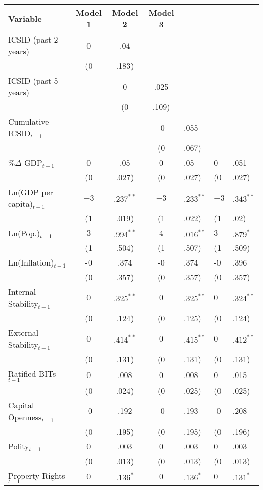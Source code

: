 \begin{table}[ht]
\centering
\begingroup\footnotesize
\begin{tabular}{lccc}
 Variable & Model 1 & Model 2 & Model 3 \\ 
  \hline
\hline
ICSID  (past 2 years) & 0&.04 &  &  \\ 
   & (0&.183) &  &  \\ 
  ICSID  (past 5 years) &  & 0&.025 &  \\ 
   &  & (0&.109) &  \\ 
  Cumulative ICSID$_{t-1}$ &  &  & -0&.055 \\ 
   &  &  & (0&.067) \\ 
  \%$\Delta$ GDP$_{t-1}$ & 0&.05 & 0&.05 & 0&.051 \\ 
   & (0&.027) & (0&.027) & (0&.027) \\ 
  Ln(GDP per capita)$_{t-1}$ & $-3$&$.237^{\ast\ast}$ & $-3$&$.233^{\ast\ast}$ & $-3$&$.343^{\ast\ast}$ \\ 
   & (1&.019) & (1&.022) & (1&.02) \\ 
  Ln(Pop.)$_{t-1}$ & $3$&$.994^{\ast\ast}$ & $4$&$.016^{\ast\ast}$ & $3$&$.879^{\ast}$ \\ 
   & (1&.504) & (1&.507) & (1&.509) \\ 
  Ln(Inflation)$_{t-1}$ & -0&.374 & -0&.374 & -0&.396 \\ 
   & (0&.357) & (0&.357) & (0&.357) \\ 
  Internal Stability$_{t-1}$ & $0$&$.325^{\ast\ast}$ & $0$&$.325^{\ast\ast}$ & $0$&$.324^{\ast\ast}$ \\ 
   & (0&.124) & (0&.125) & (0&.124) \\ 
  External Stability$_{t-1}$ & $0$&$.414^{\ast\ast}$ & $0$&$.415^{\ast\ast}$ & $0$&$.412^{\ast\ast}$ \\ 
   & (0&.131) & (0&.131) & (0&.131) \\ 
  Ratified BITs$_{t-1}$ & 0&.008 & 0&.008 & 0&.015 \\ 
   & (0&.024) & (0&.025) & (0&.025) \\ 
  Capital Openness$_{t-1}$ & -0&.192 & -0&.193 & -0&.208 \\ 
   & (0&.195) & (0&.195) & (0&.196) \\ 
  Polity$_{t-1}$ & 0&.003 & 0&.003 & 0&.003 \\ 
   & (0&.013) & (0&.013) & (0&.013) \\ 
  Property Rights$_{t-1}$ & $0$&$.136^{\ast}$ & $0$&$.136^{\ast}$ & $0$&$.131^{\ast}$ \\ 

\end{tabular}
\end{table}
